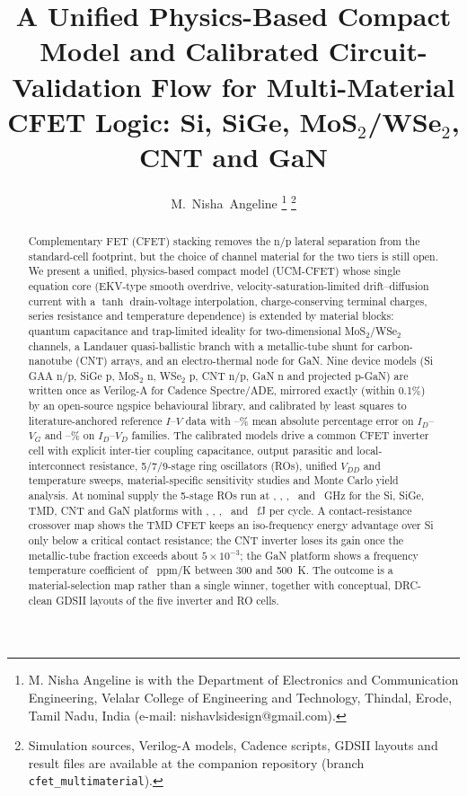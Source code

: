 \documentclass[journal]{IEEEtran}
\newcommand{\ucm}{UCM-CFET}
\begin{document}
\title{A Unified Physics-Based Compact Model and Calibrated Circuit-Validation Flow for Multi-Material CFET Logic: Si, SiGe, MoS$_2$/WSe$_2$, CNT and GaN}

\author{M.~Nisha~Angeline%
\thanks{M. Nisha Angeline is with the Department of Electronics and Communication Engineering, Velalar College of Engineering and Technology, Thindal, Erode, Tamil Nadu, India (e-mail: nishavlsidesign@gmail.com).}%
\thanks{Simulation sources, Verilog-A models, Cadence scripts, GDSII layouts and result files are available at the companion repository (branch \texttt{cfet\_multimaterial}).}}

\maketitle

\begin{abstract}
Complementary FET (CFET) stacking removes the n/p lateral separation from the standard-cell footprint, but the choice of channel material for the two tiers is still open. We present a unified, physics-based compact model (\ucm) whose single equation core (EKV-type smooth overdrive, velocity-saturation-limited drift--diffusion current with a $\tanh$ drain-voltage interpolation, charge-conserving terminal charges, series resistance and temperature dependence) is extended by material blocks: quantum capacitance and trap-limited ideality for two-dimensional MoS$_2$/WSe$_2$ channels, a Landauer quasi-ballistic branch with a metallic-tube shunt for carbon-nanotube (CNT) arrays, and an electro-thermal node for GaN. Nine device models (Si GAA n/p, SiGe p, MoS$_2$ n, WSe$_2$ p, CNT n/p, GaN n and projected p-GaN) are written once as Verilog-A for Cadence Spectre/ADE, mirrored exactly (within 0.1\%) by an open-source ngspice behavioural library, and calibrated by least squares to literature-anchored reference $I$--$V$ data with \mapeIdVgMin--\mapeIdVgMax\% mean absolute percentage error on $I_D$--$V_G$ and \mapeIdVdMin--\mapeIdVdMax\% on $I_D$--$V_D$ families. The calibrated models drive a common CFET inverter cell with explicit inter-tier coupling capacitance, output parasitic and local-interconnect resistance, 5/7/9-stage ring oscillators (ROs), unified $V_{DD}$ and temperature sweeps, material-specific sensitivity studies and Monte Carlo yield analysis. At nominal supply the 5-stage ROs run at \frosi, \frosige, \frotmd, \frocnt\ and \frogan~GHz for the Si, SiGe, TMD, CNT and GaN platforms with \ecycsi, \ecycsige, \ecyctmd, \ecyccnt\ and \ecycgan~fJ per cycle. A contact-resistance crossover map shows the TMD CFET keeps an iso-frequency energy advantage over Si only below a critical contact resistance; the CNT inverter loses its gain once the metallic-tube fraction exceeds about $5\times10^{-3}$; the GaN platform shows a frequency temperature coefficient of \tcfgan~ppm/K between 300 and 500~K. The outcome is a material-selection map rather than a single winner, together with conceptual, DRC-clean GDSII layouts of the five inverter and RO cells.
\end{abstract}
\end{document}
